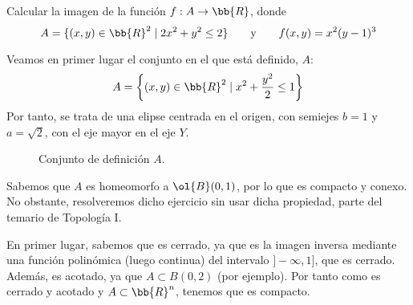 \begin{ejercicio}
    Calcular la imagen de la función $f: A \to \bb{R}$, donde
    \begin{equation*}
        A = \{(x,y)\in \bb{R}^2\mid 2x^2+y^2\leq 2\}
        \qquad \text{y} \qquad
        f(x,y)=x^2(y-1)^3
    \end{equation*}

    Veamos en primer lugar el conjunto en el que está definido, $A$:
    \begin{equation*}
        A = \left\{(x,y)\in \bb{R}^2\mid x^2+\frac{y^2}{2}\leq 1\right\}
    \end{equation*}
    Por tanto, se trata de una elipse centrada en el origen,
    con semiejes $b=1$ y $a=\sqrt{2}$, con el eje mayor en el eje $Y$.
    \begin{figure}[H]
        \centering
        \caption{Conjunto de definición $A$.}
    \end{figure}

    Sabemos que $A$ es homeomorfo a $\ol{B}(0,1)$, por lo que es compacto y conexo. 
    No obstante, resolveremos dicho ejercicio sin usar dicha propiedad, parte del temario de Topología I.
    
    En primer lugar, sabemos que es cerrado, ya que es la imagen inversa mediante una función polinómica (luego continua)
    del intervalo $]-\infty,1]$, que es cerrado. Además, es acotado, ya que $A\subset B(0, 2)$ (por ejemplo). Por tanto como es cerrado y acotado y $A\subset \bb{R}^n$, tenemos que es compacto.


\end{ejercicio}
